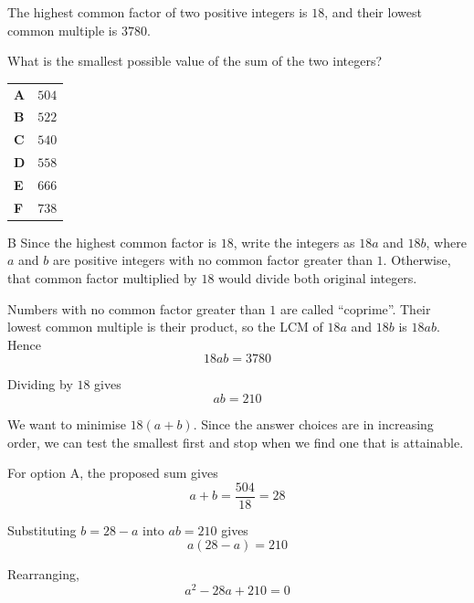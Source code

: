 \documentclass[11pt,a4paper]{article}
\begin{document}
\clearpage
\thispagestyle{djssolutions}
\vspace*{8pt}
\begin{enumerate}[label=\textbf{\arabic*.},leftmargin=*,itemsep=0pt,start=19]
\questionitem[Number]
The highest common factor of two positive integers is $18$, and their lowest common multiple is $3780$.

What is the smallest possible value of the sum of the two integers?

\par\vspace*{12pt}
\begin{tabularx}{\linewidth}{@{}>{\bfseries}l Y@{}}
A &
$504$
\\[0.8em]
B &
$522$
\\[0.8em]
C &
$540$
\\[0.8em]
D &
$558$
\\[0.8em]
E &
$666$
\\[0.8em]
F &
$738$
\\
\end{tabularx}

\begin{djsSolution}{B}
Since the highest common factor is $18$, write the integers as $18a$ and $18b$, where $a$ and $b$ are positive integers with no common factor greater than $1$. Otherwise, that common factor multiplied by $18$ would divide both original integers.

Numbers with no common factor greater than $1$ are called ``coprime''. Their lowest common multiple is their product, so the LCM of $18a$ and $18b$ is $18ab$. Hence
\[
18ab=3780
\]

Dividing by $18$ gives
\[
ab=210
\]

We want to minimise $18(a+b)$. Since the answer choices are in increasing order, we can test the smallest first and stop when we find one that is attainable.

For option A, the proposed sum gives
\[
a+b=\frac{504}{18}=28
\]

Substituting $b=28-a$ into $ab=210$ gives
\[
a(28-a)=210
\]

Rearranging,
\[
a^2-28a+210=0
\]


\end{djsSolution}
\end{enumerate}
\end{document}

